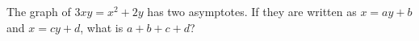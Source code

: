 The graph of $3xy=x^2+2y$ has two asymptotes. If they are written as $x=ay+b$ and $x=cy+d$, what is $a+b+c+d$?

